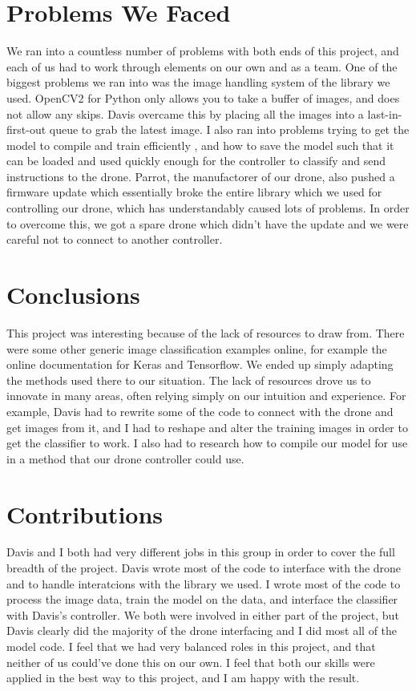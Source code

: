 \documentclass[12pt]{article}
\begin{document}
\section{Problems We Faced}
{
	We ran into a countless number of problems with both ends of this project, and each of us had to work through elements on our own and as a team.
	One of the biggest problems we ran into was the image handling system of the library we used. 
	OpenCV2 for Python only allows you to take a buffer of images, and does not allow any skips. 
	Davis overcame this by placing all the images into a last-in-first-out queue to grab the latest image.  
	I also ran into problems trying to get the model to compile and train efficiently , and how to save the model such that it can be loaded and used quickly enough for the controller to classify and send instructions to the drone. 
	Parrot, the manufactorer of our drone, also pushed a firmware update which essentially broke the entire library which we used for controlling our drone, which has understandably caused lots of problems. 
	In order to overcome this, we got a spare drone which didn't have the update and we were careful not to connect to another controller.
}

\section{Conclusions}
{
	This project was interesting because of the lack of resources to draw from.
	There were some other generic image classification examples online, for example the online documentation for Keras and Tensorflow. 
	We ended up simply adapting the methods used there to our situation. 
	The lack of resources drove us to innovate in many areas, often relying simply on our intuition and experience. 
	For example, Davis had to rewrite some of the code to connect with the drone and get images from it, and I had to reshape and alter the training images in order to get the classifier to work. 
	I also had to research how to compile our model for use in a method that our drone controller could use.
}

\section{Contributions} {
	Davis and I both had very different jobs in this group in order to cover the full breadth of the project.
	Davis wrote most of the code to interface with the drone and to handle interatcions with the library we used. 
	I wrote most of the code to process the image data, train the model on the data, and interface the classifier with Davis's controller.
	We both were involved in either part of the project, but Davis clearly did the majority of the drone interfacing and I did most all of the model code.
	I feel that we had very balanced roles in this project, and that neither of us could've done this on our own.
	I feel that both our skills were applied in the best way to this project, and I am happy with the result.
}
\end{document}
